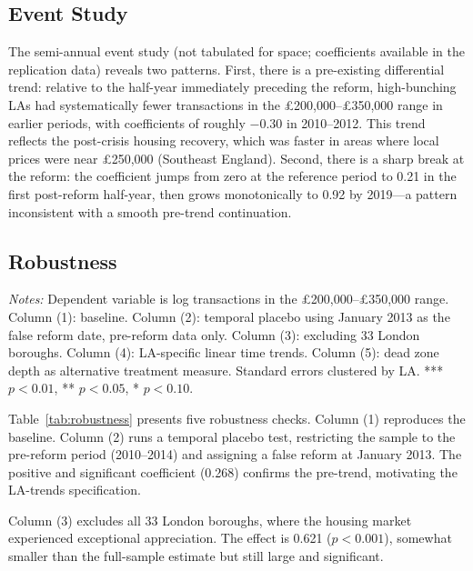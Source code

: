 \documentclass[12pt]{article}
\begin{document}
\subsection{Event Study}

The semi-annual event study (not tabulated for space; coefficients available in the replication data) reveals two patterns. First, there is a pre-existing differential trend: relative to the half-year immediately preceding the reform, high-bunching LAs had systematically fewer transactions in the \pounds200,000--\pounds350,000 range in earlier periods, with coefficients of roughly $-0.30$ in 2010--2012. This trend reflects the post-crisis housing recovery, which was faster in areas where local prices were near \pounds250,000 (Southeast England). Second, there is a sharp break at the reform: the coefficient jumps from zero at the reference period to 0.21 in the first post-reform half-year, then grows monotonically to 0.92 by 2019---a pattern inconsistent with a smooth pre-trend continuation.

\subsection{Robustness}

\begin{table}[htbp]
\caption{Robustness Checks}
\label{tab:robustness}

\begin{minipage}{0.95\textwidth}\vspace{0.3em}
\footnotesize\textit{Notes:} Dependent variable is log transactions in the \pounds200,000--\pounds350,000 range. Column (1): baseline. Column (2): temporal placebo using January 2013 as the false reform date, pre-reform data only. Column (3): excluding 33 London boroughs. Column (4): LA-specific linear time trends. Column (5): dead zone depth as alternative treatment measure. Standard errors clustered by LA. *** $p<0.01$, ** $p<0.05$, * $p<0.10$.
\end{minipage}
\end{table}

Table~\ref{tab:robustness} presents five robustness checks. Column (1) reproduces the baseline. Column (2) runs a temporal placebo test, restricting the sample to the pre-reform period (2010--2014) and assigning a false reform at January 2013. The positive and significant coefficient (0.268) confirms the pre-trend, motivating the LA-trends specification.

Column (3) excludes all 33 London boroughs, where the housing market experienced exceptional appreciation. The effect is 0.621 ($p < 0.001$), somewhat smaller than the full-sample estimate but still large and significant.
\end{document}
